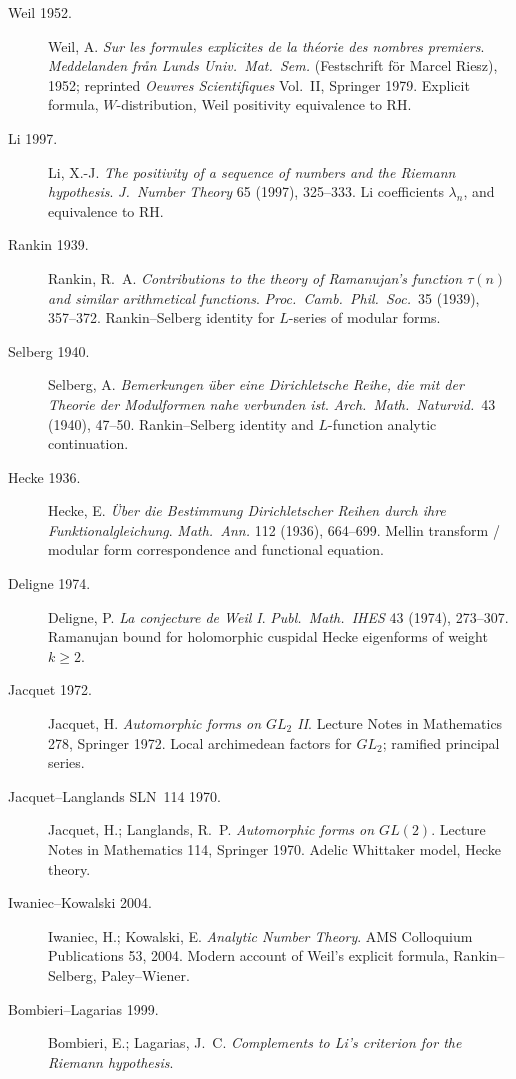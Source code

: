 \begin{description}
\item[Weil 1952.] Weil, A. \emph{Sur les formules explicites de la
th\'eorie des nombres premiers}. \emph{Meddelanden fr\r{a}n Lunds
Univ.~Mat.~Sem.} (Festschrift f\"or Marcel Riesz), 1952; reprinted
\emph{Oeuvres Scientifiques} Vol.~II, Springer 1979. Explicit formula,
\(W\)-distribution, Weil positivity equivalence to RH.
\item[Li 1997.] Li, X.-J. \emph{The positivity of a sequence of
numbers and the Riemann hypothesis}. \emph{J.~Number Theory} 65
(1997), 325--333. Li coefficients \(\lambda_{n}\),
and equivalence to RH.
\item[Rankin 1939.] Rankin, R.~A. \emph{Contributions to the theory
of Ramanujan's function \(\tau(n)\) and similar arithmetical functions}.
\emph{Proc.~Camb.~Phil.~Soc.}~35 (1939), 357--372. Rankin--Selberg
identity for \(L\)-series of modular forms.
\item[Selberg 1940.] Selberg, A. \emph{Bemerkungen \"uber eine
Dirichletsche Reihe, die mit der Theorie der Modulformen nahe
verbunden ist}. \emph{Arch.~Math.~Naturvid.}~43 (1940), 47--50.
Rankin--Selberg identity and \(L\)-function analytic continuation.
\item[Hecke 1936.] Hecke, E. \emph{\"Uber die Bestimmung Dirichletscher
Reihen durch ihre Funktionalgleichung}. \emph{Math.~Ann.} 112
(1936), 664--699. Mellin transform / modular form correspondence
and functional equation.
\item[Deligne 1974.] Deligne, P. \emph{La conjecture de Weil I}.
\emph{Publ.~Math.~IHES} 43 (1974), 273--307. Ramanujan bound for
holomorphic cuspidal Hecke eigenforms of weight \(k\geq 2\).
\item[Jacquet 1972.] Jacquet, H. \emph{Automorphic forms on \(GL_{2}\)
II}. Lecture Notes in Mathematics 278, Springer 1972. Local
archimedean factors for \(GL_{2}\); ramified principal series.
\item[Jacquet--Langlands SLN~114 1970.] Jacquet, H.;
Langlands, R.~P. \emph{Automorphic forms on \(GL(2)\)}. Lecture Notes
in Mathematics 114, Springer 1970. Adelic Whittaker model, Hecke
theory.
\item[Iwaniec--Kowalski 2004.] Iwaniec, H.; Kowalski, E.
\emph{Analytic Number Theory}. AMS Colloquium Publications 53, 2004.
Modern account of Weil's explicit formula, Rankin--Selberg,
Paley--Wiener.
\item[Bombieri--Lagarias 1999.] Bombieri, E.; Lagarias, J.~C.
\emph{Complements to Li's criterion for the Riemann hypothesis}.

\end{description}
